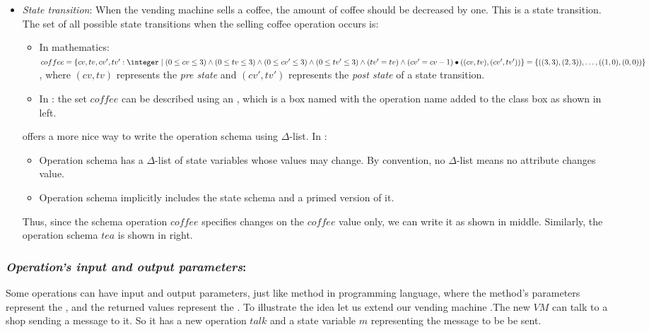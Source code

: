 \begin{itemize}
\item \textit{State transition}: When the vending machine sells a coffee, the amount of coffee should be decreased by one. This is a state transition.
The set of all possible state transitions when the selling coffee operation occurs is:
\begin{itemize}
\item In mathematics: $coffee =\{cv,tv,cv',tv': \integer\mid (0 \leq  cv \leq 3) \wedge
(0 \leq  tv \leq 3)\wedge (0 \leq  cv' \leq 3) \wedge (0 \leq  tv' \leq 3)\wedge (tv' = tv) \wedge (cv' = cv - 1) \bullet\pair{\pair{cv}{tv}}{\pair{cv'}{tv'}}\}  =\{\pair{\pair{3}{3}}{\pair{2}{3}},\dots,\pair{\pair{1}{0}}{\pair{0}{0}}\}$, where $(cv,tv)$ represents the \textit{pre state} and $(cv',tv')$ represents the \textit{post state} of a state transition.
\item In \oz{}: the set $coffee$ can be described using an , which is a box named with the operation name added to the class box as shown in  left.
\end{itemize}



\oz{} offers a more nice way to write the operation schema using $\Delta$-list. In \oz{}:
\begin{itemize}
\item Operation schema has a $\Delta$-list of state variables
whose values may change. By convention, no $\Delta$-list means
no attribute changes value.
\item Operation schema implicitly
includes the state schema and a primed version of it.
\end{itemize}
Thus, since the schema operation $coffee$ specifies changes on the $coffee$ value only, we can write it as shown in  middle. 
Similarly, the operation schema $tea$ is shown in  right.
\end{itemize}

\subsubsection{\textit{Operation's input and output parameters}:} 
\label{operation_input_output_parameters} 
Some operations can have input and output parameters, just like method in programming language, where the method's parameters represent the , and the returned values represent the . To illustrate the idea let us extend our vending machine .The new $VM$ can talk to a shop sending a message to it. So it has a new operation $talk$ and a state variable $m$ representing the message to be be sent.

